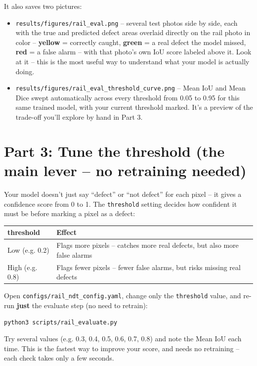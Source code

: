 \documentclass[11pt]{article}
\begin{document}
It also saves two pictures:
\begin{itemize}
  \item \texttt{results/figures/rail\_eval.png} -- several test photos side
  by side, each with the true and predicted defect areas overlaid directly
  on the rail photo in color -- \textbf{yellow} = correctly caught,
  \textbf{green} = a real defect the model missed, \textbf{red} = a false
  alarm -- with that photo's own IoU score labeled above it. Look at it --
  this is the most useful way to understand what your model is actually
  doing.
  \item \texttt{results/figures/rail\_eval\_threshold\_curve.png} -- Mean IoU
  and Mean Dice swept automatically across every threshold from 0.05 to
  0.95 for this same trained model, with your current threshold marked. It's
  a preview of the trade-off you'll explore by hand in Part 3.
\end{itemize}

\section*{Part 3: Tune the threshold (the main lever -- no retraining needed)}
Your model doesn't just say ``defect'' or ``not defect'' for each pixel --
it gives a confidence score from 0 to 1. The \texttt{threshold} setting
decides how confident it must be before marking a pixel as a defect:

\begin{center}
\begin{tabular}{@{}lp{9.5cm}@{}}
\toprule
\textbf{threshold} & \textbf{Effect} \\
\midrule
Low (e.g. 0.2)  & Flags more pixels -- catches more real defects, but also more false alarms \\
High (e.g. 0.8) & Flags fewer pixels -- fewer false alarms, but risks missing real defects \\
\bottomrule
\end{tabular}
\end{center}

Open \texttt{configs/rail\_ndt\_config.yaml}, change only the
\texttt{threshold} value, and re-run \textbf{just} the evaluate step (no
need to retrain):

\begin{lstlisting}
python3 scripts/rail_evaluate.py
\end{lstlisting}

\begin{tipbox}
Try several values (e.g. 0.3, 0.4, 0.5, 0.6, 0.7, 0.8) and note the Mean IoU
each time. This is the fastest way to improve your score, and needs no
retraining -- each check takes only a few seconds.
\end{tipbox}
\end{document}
